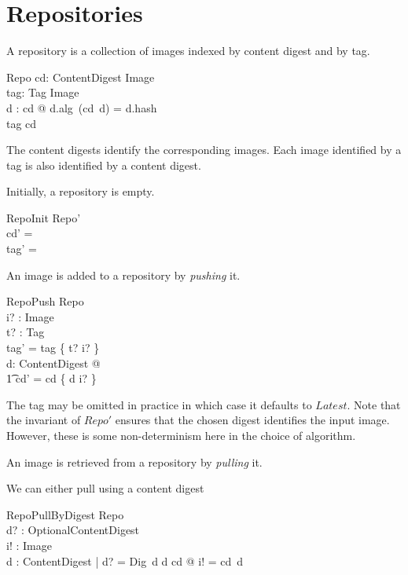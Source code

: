 \documentclass[a4paper,twoside,12pt]{article}
\begin{document}
\newpage
\section{Repositories}

A repository is a collection of images indexed by content digest and by tag.
\begin{schema}{Repo}
    cd: ContentDigest \pfun Image \\
    tag: Tag \pfun Image \\
\where
    \forall d : \dom cd @ d.alg~(cd~d) = d.hash \\
    \ran tag \subseteq \ran cd \\
\end{schema}
The content digests identify the corresponding images. Each image identified by a tag is also identified by a content digest.

Initially, a repository is empty.
\begin{schema}{RepoInit}
  Repo' \\
\where
  cd' = \emptyset \\
  tag' = \emptyset \\
\end{schema}
 
 An image is added to a repository by \textit{pushing} it.
\begin{schema}{RepoPush}
  \Delta Repo \\
  i? : Image \\
  t? : Tag \\
\where
  tag' = tag \oplus \{ t? \mapsto i? \} \\
  \exists d: ContentDigest @ \\
  \t1 cd' = cd \oplus \{ d \mapsto i? \} \\
\end{schema}
The tag may be omitted in practice in which case it defaults to $Latest$. Note that the invariant of $Repo'$ ensures that the chosen digest identifies the input image. However, these is some non-determinism here in the choice of algorithm.

An image is retrieved from a repository by \textit{pulling} it.

We can either pull using a content digest
\begin{schema}{RepoPullByDigest}
  \Xi Repo \\
  d? : OptionalContentDigest \\
  i! : Image \\
\where
  \exists d : ContentDigest | d? = Dig~d  \land d \in \dom cd @ i! = cd~d \\
\end{schema}
\end{document}
